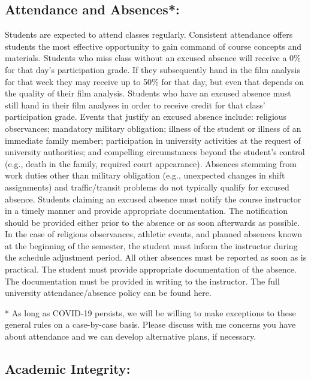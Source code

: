 \documentclass[
]{book}
\begin{document}
\hypertarget{attendance-and-absences}{%
\subsection{Attendance and Absences*:}\label{attendance-and-absences}}

Students are expected to attend classes regularly. Consistent attendance offers students the most effective opportunity to gain command of course concepts and materials. Students who miss class without an excused absence will receive a 0\% for that day's participation grade. If they subsequently hand in the film analysis for that week they may receive up to 50\% for that day, but even that depends on the quality of their film analysis. Students who have an excused absence must still hand in their film analyses in order to receive credit for that class' participation grade. Events that justify an excused absence include: religious observances; mandatory military obligation; illness of the student or illness of an immediate family member; participation in university activities at the request of university authorities; and compelling circumstances beyond the student's control (e.g., death in the family, required court appearance). Absences stemming from work duties other than military obligation (e.g., unexpected changes in shift assignments) and traffic/transit problems do not typically qualify for excused absence. Students claiming an excused absence must notify the course instructor in a timely manner and provide appropriate documentation. The notification should be provided either prior to the absence or as soon afterwards as possible. In the case of religious observances, athletic events, and planned absences known at the beginning of the semester, the student must inform the instructor during the schedule adjustment period. All other absences must be reported as soon as is practical. The student must provide appropriate documentation of the absence. The documentation must be provided in writing to the instructor. The full university attendance/absence policy can be found here.

* As long as COVID-19 persists, we will be willing to make exceptions to these general rules on a case-by-case basis. Please discuss with me concerns you have about attendance and we can develop alternative plans, if necessary.

\hypertarget{academic-integrity}{%
\subsection{Academic Integrity:}\label{academic-integrity}}
\end{document}
